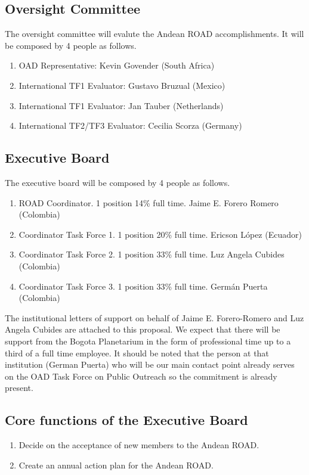 \documentclass[12pt]{article}
\begin{document}
\subsection*{Oversight Committee}

The oversight committee will evalute the Andean ROAD
accomplishments. It will be composed by 4 people as follows.
\begin{enumerate}
\item OAD Representative: Kevin Govender (South Africa)
\item International TF1 Evaluator: Gustavo Bruzual (Mexico)
\item International TF1 Evaluator: Jan Tauber (Netherlands)
\item International TF2/TF3 Evaluator: Cecilia Scorza (Germany)
\end{enumerate}
\subsection*{Executive Board}
\noindent
The executive board will be composed by 4 people as follows.
\begin{enumerate}
\item ROAD Coordinator. 1 position 14\% full time. Jaime E. Forero
  Romero (Colombia) 
\item Coordinator Task Force 1. 1 position 20\% full time. Ericson
  L\'opez (Ecuador) 
\item Coordinator Task Force 2. 1 position 33\% full time. Luz Angela
  Cubides (Colombia) 
\item Coordinator Task Force 3. 1 position 33\% full time. Germán
  Puerta (Colombia) 
\end{enumerate}

\noindent
The institutional letters of support on behalf of Jaime
E. Forero-Romero and Luz Angela Cubides are attached to this
proposal. We expect that there will be support from the Bogota
Planetarium in the form of professional time up to a third of a full
time employee. It should be noted that the person at that institution
(German Puerta) who will be our main contact point already serves on
the OAD Task Force on Public Outreach so the commitment is already
present. 

\subsection*{Core functions of the Executive Board}

\begin{enumerate}
\item Decide on the acceptance of new members to the Andean ROAD.
\item Create an annual action plan for the Andean ROAD.
\end{enumerate}
\end{document}
